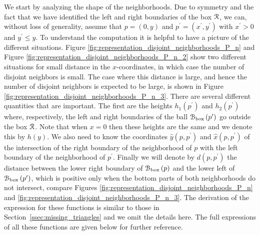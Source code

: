 We start by analyzing the shape of the neighborhoods. Due to symmetry and the fact that we have identified the left and right boundaries of the box ${\mathcal R}$, we can, without loss of generality, assume that $p = (0,y)$ and $p^\prime = (x^\prime,y^\prime)$ with $x^\prime > 0$ and $y^\prime \le y$. To understand the computation it is helpful to have a picture of the different situations. Figure \ref{fig:representation_disjoint_neighborhoods_P_n} and Figure \ref{fig:representation_disjoint_neighborhoods_P_n_2} show two different situations for small distance in the $x$-coordinates, in which case the number of disjoint neighbors is small. The case where this distance is large, and hence the number of disjoint neighbors is expected to be large, is shown in Figure \ref{fig:representation_disjoint_neighborhoods_P_n_3}. There are several different quantities that are important. The first are the heights $h_1(p^\prime)$ and $h_2(p^\prime)$ where, respectively, the left and right boundaries of the ball ${\mathcal B}_{\text{box}}\left(p^\prime\right)$ go outside the box ${\mathcal R}$. Note that when $x = 0$ then these heights are the same and we denote this by $h(y)$. We also need to know the coordinates $\hat{y}(p,p^\prime)$ and $\hat{x}(p,p^\prime)$ of the intersection of the right boundary of the neighborhood of $p$ with the left boundary of the neighborhood of $p^\prime$. Finally we will denote by $d(p,p^\prime)$ the distance between the lower right boundary of ${\mathcal B}_{\text{box}}\left(p\right)$ and the lower left of ${\mathcal B}_{\text{box}}\left(p^\prime\right)$, which is positive only when the bottom parts of both neighborhoods do not intersect, compare Figures \ref{fig:representation_disjoint_neighborhoods_P_n} and \ref{fig:representation_disjoint_neighborhoods_P_n_3}. The derivation of the expression for these functions is similar to those in Section~\ref{ssec:missing_triangles} and we omit the details here. The full expressions of all these functions are given below for further reference.

